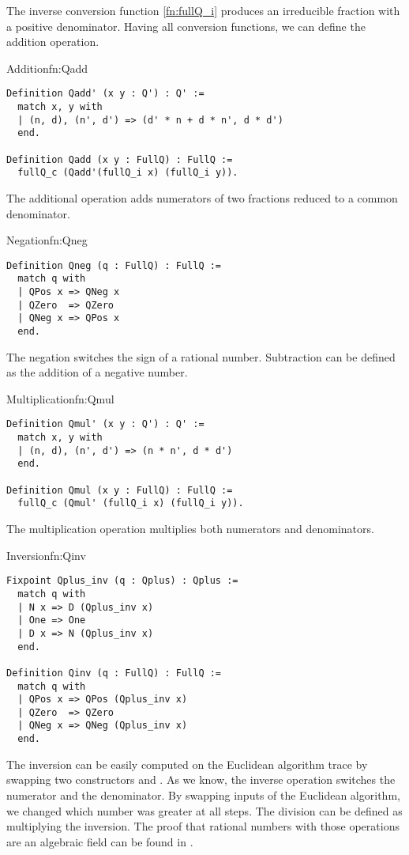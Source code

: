 The inverse conversion function \ref{fn:fullQ_i} produces an irreducible fraction with a positive denominator. Having all conversion functions, we can define the addition operation.
\begin{func}{Addition}{fn:Qadd}
\begin{verbatim}
Definition Qadd' (x y : Q') : Q' :=
  match x, y with
  | (n, d), (n', d') => (d' * n + d * n', d * d')
  end.

Definition Qadd (x y : FullQ) : FullQ :=
  fullQ_c (Qadd'(fullQ_i x) (fullQ_i y)).
\end{verbatim}
\end{func}
The additional operation adds numerators of two fractions reduced to a common denominator.
\begin{func}{Negation}{fn:Qneg}
\begin{verbatim}
Definition Qneg (q : FullQ) : FullQ :=
  match q with
  | QPos x => QNeg x
  | QZero  => QZero
  | QNeg x => QPos x
  end.
\end{verbatim}
\end{func}
The negation switches the sign of a rational number. Subtraction can be defined as the addition of a negative number.
\begin{func}{Multiplication}{fn:Qmul}
\begin{verbatim}
Definition Qmul' (x y : Q') : Q' :=
  match x, y with
  | (n, d), (n', d') => (n * n', d * d')
  end.

Definition Qmul (x y : FullQ) : FullQ :=
  fullQ_c (Qmul' (fullQ_i x) (fullQ_i y)).
\end{verbatim}
\end{func}
The multiplication operation multiplies both numerators and denominators.
\begin{func}[D]{Inversion}{fn:Qinv}
\begin{verbatim}
Fixpoint Qplus_inv (q : Qplus) : Qplus :=
  match q with
  | N x => D (Qplus_inv x)
  | One => One
  | D x => N (Qplus_inv x)
  end.

Definition Qinv (q : FullQ) : FullQ :=
  match q with
  | QPos x => QPos (Qplus_inv x)
  | QZero  => QZero
  | QNeg x => QNeg (Qplus_inv x)
  end.
\end{verbatim}
\end{func}
The inversion can be easily computed on the Euclidean algorithm trace by swapping two constructors  and . As we know, the inverse operation switches the numerator and the denominator. By swapping inputs of the Euclidean algorithm, we changed which number was greater at all steps. The division can be defined as multiplying the inversion. The proof that rational numbers with those operations are an algebraic field can be found in .
